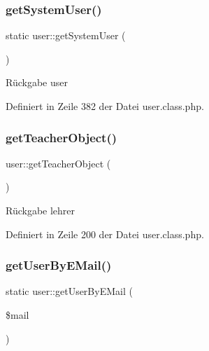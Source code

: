 \subsubsection{\texorpdfstring{get\+System\+User()}{getSystemUser()}}
{\footnotesize\ttfamily static user\+::get\+System\+User (\begin{DoxyParamCaption}{ }\end{DoxyParamCaption})\hspace{0.3cm}{\ttfamily [static]}}

\begin{DoxyReturn}{Rückgabe}
user 
\end{DoxyReturn}


Definiert in Zeile 382 der Datei user.\+class.\+php.

\mbox{\label{classuser_abf5d10bc8b0da312ea245cb945060e50}} 
\subsubsection{\texorpdfstring{get\+Teacher\+Object()}{getTeacherObject()}}
{\footnotesize\ttfamily user\+::get\+Teacher\+Object (\begin{DoxyParamCaption}{ }\end{DoxyParamCaption})}

\begin{DoxyReturn}{Rückgabe}
lehrer 
\end{DoxyReturn}


Definiert in Zeile 200 der Datei user.\+class.\+php.

\mbox{\label{classuser_a59ee10edc17f5878d04f7154aa0df885}} 
\subsubsection{\texorpdfstring{get\+User\+By\+E\+Mail()}{getUserByEMail()}}
{\footnotesize\ttfamily static user\+::get\+User\+By\+E\+Mail (\begin{DoxyParamCaption}\item[{}]{\$mail }\end{DoxyParamCaption})\hspace{0.3cm}{\ttfamily [static]}}


